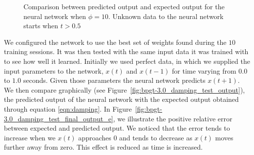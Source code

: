 \documentclass[11pt]{article}
\begin{document}
\begin{figure}[t]
	\centering
	\caption{Comparison between predicted output and expected output for the neural network when $\phi=10$. Unknown data to the neural network starts when $t > 0.5$}	\label{fig:bpgt-3.0_damping_test_output_phi_we}	
\end{figure}

We configured the network to use the best set of weights found during the $10$ training sessions. It was then tested with the same input
data it was trained with to see how well it learned. Initially we used perfect data, in which we supplied the input parameters to the
network, $x(t)$ and $x(t-1)$ for time varying from $0.0$ to $1.0$ seconds. Given those parameters the neural network predicts $x(t+1)$.
We then compare graphically (see Figure~\ref{fig:bpgt-3.0_damping_test_output}), the predicted output of the neural network with the
expected output obtained through equation \ref{eqn:damping}. In Figure~\ref{fig:bpgt-3.0_damping_test_final_output_e}, we illustrate the
positive relative error between expected and predicted output. We noticed that the error tends to increase when we $x(t)$ approaches
$0$ and tends to decrease as $x(t)$ moves further away from zero. This effect is reduced as time is increased.
\end{document}
